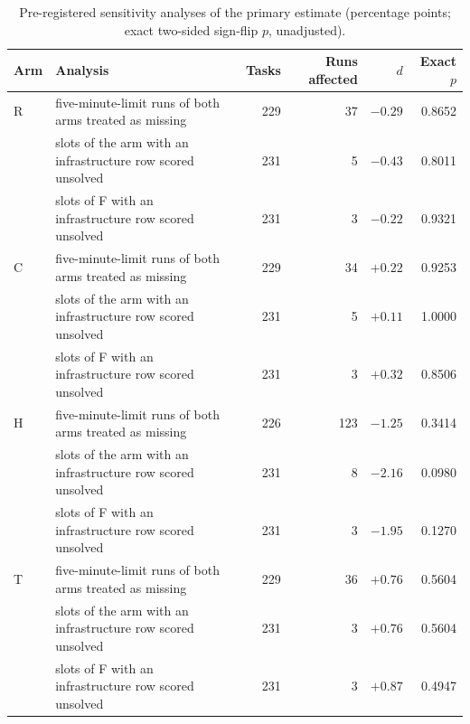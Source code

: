 \begin{table}[!htb]
\centering
\caption{Pre-registered sensitivity analyses of the primary estimate (percentage points; exact two-sided sign-flip $p$, unadjusted).}\label{tab:s-sens}
\footnotesize
\begin{tabular}{llrrrr}
\toprule
Arm & Analysis & Tasks & Runs affected & $d$ & Exact $p$ \\
\midrule
R & five-minute-limit runs of both arms treated as missing & 229 & 37 & ${-}0.29$ & 0.8652 \\
 & slots of the arm with an infrastructure row scored unsolved & 231 & 5 & ${-}0.43$ & 0.8011 \\
 & slots of F with an infrastructure row scored unsolved & 231 & 3 & ${-}0.22$ & 0.9321 \\
C & five-minute-limit runs of both arms treated as missing & 229 & 34 & ${+}0.22$ & 0.9253 \\
 & slots of the arm with an infrastructure row scored unsolved & 231 & 5 & ${+}0.11$ & 1.0000 \\
 & slots of F with an infrastructure row scored unsolved & 231 & 3 & ${+}0.32$ & 0.8506 \\
H & five-minute-limit runs of both arms treated as missing & 226 & 123 & ${-}1.25$ & 0.3414 \\
 & slots of the arm with an infrastructure row scored unsolved & 231 & 8 & ${-}2.16$ & 0.0980 \\
 & slots of F with an infrastructure row scored unsolved & 231 & 3 & ${-}1.95$ & 0.1270 \\
T & five-minute-limit runs of both arms treated as missing & 229 & 36 & ${+}0.76$ & 0.5604 \\
 & slots of the arm with an infrastructure row scored unsolved & 231 & 3 & ${+}0.76$ & 0.5604 \\
 & slots of F with an infrastructure row scored unsolved & 231 & 3 & ${+}0.87$ & 0.4947 \\
\bottomrule
\end{tabular}
\end{table}
